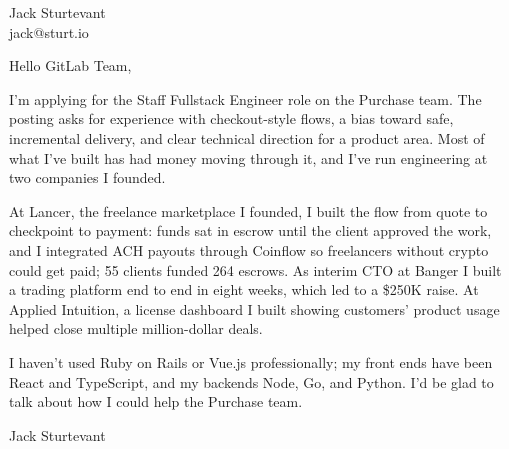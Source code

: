 \documentclass[11pt]{article}
\begin{document}
\raggedright

{\namefont\fontsize{20pt}{24pt}\selectfont Jack Sturtevant}\\[-0.3em]
jack@sturt.io

\vspace{1.2em}

Hello GitLab Team,

I'm applying for the Staff Fullstack Engineer role on the Purchase team. The posting asks for experience with checkout-style flows, a bias toward safe, incremental delivery, and clear technical direction for a product area. Most of what I've built has had money moving through it, and I've run engineering at two companies I founded.

At Lancer, the freelance marketplace I founded, I built the flow from quote to checkpoint to payment: funds sat in escrow until the client approved the work, and I integrated ACH payouts through Coinflow so freelancers without crypto could get paid; 55 clients funded 264 escrows. As interim CTO at Banger I built a trading platform end to end in eight weeks, which led to a \$250K raise. At Applied Intuition, a license dashboard I built showing customers' product usage helped close multiple million-dollar deals.

I haven't used Ruby on Rails or Vue.js professionally; my front ends have been React and TypeScript, and my backends Node, Go, and Python. I'd be glad to talk about how I could help the Purchase team.

\vspace{0.6em}
Jack Sturtevant
\end{document}
